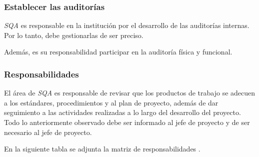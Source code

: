 \subsubsection{Establecer las auditorías}

\textit{SQA} es responsable en la institución por el desarrollo de las auditorías internas. Por lo tanto, debe gestionarlas de ser preciso.

Además, es su responsabilidad participar en la auditoría física y funcional.

\subsubsection{Responsabilidades}

El área de \textit{SQA} es responsable de revisar que los productos de trabajo se adecuen a los estándares, procedimientos y al plan de proyecto, además de dar seguimiento a las actividades realizadas a lo largo del desarrollo del proyecto. Todo lo anteriormente observado debe ser informado al jefe de proyecto y de ser necesario al jefe de proyecto.

En la siguiente tabla se adjunta la matriz de responsabilidades \citet{web00}.

